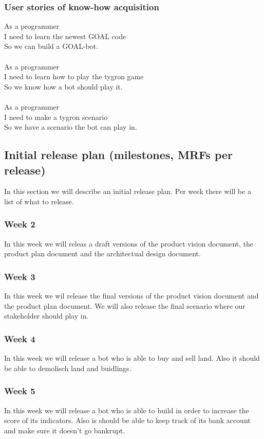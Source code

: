 \subsubsection{User stories of know-how acquisition}
As a programmer\\
I need to learn the newest GOAL code\\
So we can build a GOAL-bot.\\
\\
As a programmer\\
I need to learn how to play the tygron game\\
So we know how a bot should play it.\\
\\
As a programmer\\
I need to make a tygron scenario\\
So we have a scenario the bot can play in.\\

\subsection{Initial release plan (milestones, MRFs per release)}
In this section we will describe an initial release plan. Per week there will be a list of what to release.

\subsubsection{Week 2}
In this week we will releas a draft versions of the product vision document, the product plan document and the architectual design document.

\subsubsection{Week 3}
In this week we wil release the final versions of the product vision document and the product plan document. We will also release the final scenario where our stakeholder should play in.

\subsubsection{Week 4}
In this week we will release a bot who is able to buy and sell land. Also it should be able to demolisch land and buidlings.

\subsubsection{Week 5}
In this week we will release a bot who is able to build in order to increase the score of its indicators. Also is should be able to keep track of its bank account and make sure it doesn't go bankrupt.


